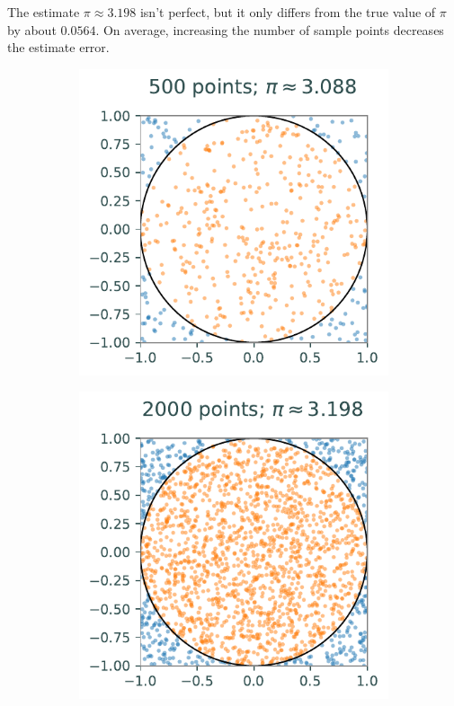 The estimate $\pi \approx 3.198$ isn't perfect, but it only differs from the true value of $\pi$ by about $0.0564$.
On average, increasing the number of sample points decreases the estimate error.

\begin{figure}[H] %
\captionsetup[subfigure]{justification=centering}
\centering
\begin{subfigure}{.32\textwidth}
    \centering
    \includegraphics[width=\textwidth]{figures/mc_circle_0500.pdf}
\end{subfigure}
%
\begin{subfigure}{.32\textwidth}
    \centering
    \includegraphics[width=\textwidth]{figures/mc_circle_2000.pdf}

\end{subfigure}
\end{figure}

